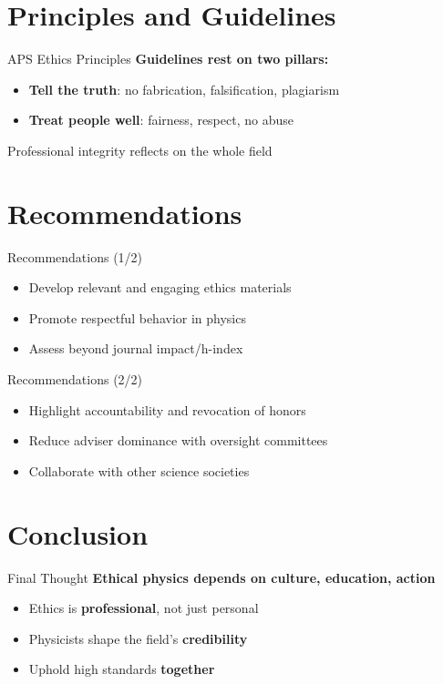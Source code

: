 \section{Principles and Guidelines}
\begin{frame}{APS Ethics Principles}
\textbf{Guidelines rest on two pillars:}
\begin{itemize}
  \item<1-> \textbf{Tell the truth}: no fabrication, falsification, plagiarism
  \item<2-> \textbf{Treat people well}: fairness, respect, no abuse
\end{itemize}
\pause
\alert{Professional integrity reflects on the whole field}
\end{frame}

\section{Recommendations}
\begin{frame}{Recommendations (1/2)}
\begin{itemize}
  \item<1-> Develop relevant and engaging ethics materials
  \item<2-> Promote respectful behavior in physics
  \item<3-> Assess beyond journal impact/h-index
\end{itemize}
\end{frame}

\begin{frame}{Recommendations (2/2)}
\begin{itemize}
  \item<1-> Highlight accountability and revocation of honors
  \item<2-> Reduce adviser dominance with oversight committees
  \item<3-> Collaborate with other science societies
\end{itemize}
\end{frame}

\section{Conclusion}
\begin{frame}{Final Thought}
\textbf{Ethical physics depends on culture, education, action}
\begin{itemize}
  \item<1-> Ethics is \textbf{professional}, not just personal
  \item<2-> Physicists shape the field’s \textbf{credibility}
  \item<3-> \alert{Uphold high standards \textbf{together}}
\end{itemize}
\end{frame}

